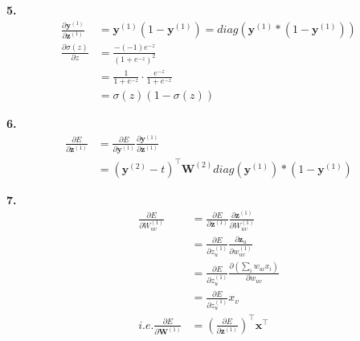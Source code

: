 \documentclass{article}
\begin{document}
\textbf{5.}\\
\begin{equation}
\begin{aligned}
\frac{\partial \mathbf y^{(1)}}{\partial \mathbf z^{(1)}}&=\mathbf y^{(1)}(1-\mathbf y^{(1)})=diag(\mathbf y^{(1)}*(1-\mathbf y^{(1)}))\\
\frac{\partial \sigma( z)}{\partial z}&=\frac{-(-1)e^{-z}}{(1+e^{- z})^2}\\
&=\frac{1}{1+e^{- z}}\cdot \frac{e^{-z}}{1+e^{-z}}\\
&=\sigma(z)(1-\sigma(z))
\end{aligned}
\end{equation}

\textbf{6.}\\

\begin{equation}
\begin{aligned}
\frac{\partial E}{\partial \mathbf{z}^{(1)}}&=\frac{\partial E}{\partial \mathbf{y}^{(1)}}\frac{\partial \mathbf y^{(1)}}{\partial \mathbf{z}^{(1)}}\\
&=(\mathbf y^{(2)}-t)^\top \mathbf W^{(2)}diag(\mathbf y^{(1)})*(1-\mathbf y^{(1)})
\end{aligned}
\end{equation}


\textbf{7.}\\
\begin{equation}
\begin{aligned}
\frac{\partial E}{\partial W_{uv}^{(1)}}&=\frac{\partial E}{\partial \mathbf{z}^{(1)}}\frac{\partial \mathbf{z}^{(1)}}{\partial W_{uv}^{(1)}}\\
&=\frac{\partial E}{\partial z_u^{(1)}} \frac{\partial \mathbf z_u}{\partial w_{uv}^{(1)}} \\
&=\frac{\partial E}{\partial z_u^{(1)}} \frac{\partial(\sum_i w_{ui}x_i)}{\partial w_{uv}}\\
&=\frac{\partial E}{\partial z_u^{(1)}}x_v\\
i.e.\frac{\partial E}{\partial \mathbf W^{(1)}}&=(\frac{\partial E}{\partial \mathbf z^{(1)}})^\top\mathbf x^\top
\end{aligned}
\end{equation}
\end{document}
